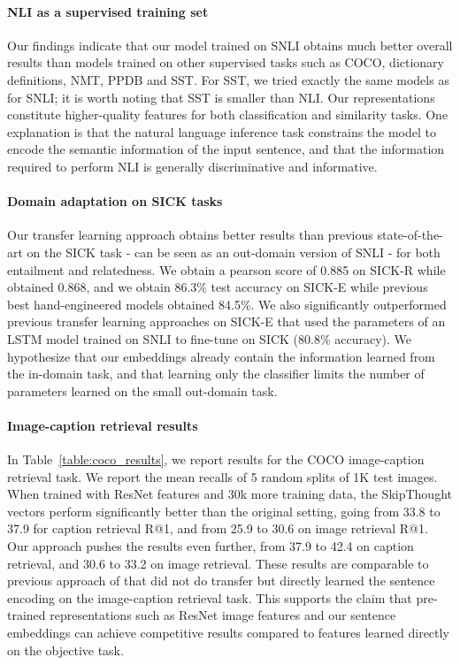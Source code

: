 \documentclass[11pt,letterpaper]{article}
\begin{document}
\paragraph{NLI as a supervised training set}
Our findings indicate that our model trained on SNLI obtains much better overall results than models trained on other supervised tasks such as COCO, dictionary definitions, NMT, PPDB \cite{ganitkevitch2013ppdb} and SST. 
For SST, we tried exactly the same models as for SNLI; it is worth noting that SST is smaller than NLI.
Our representations constitute higher-quality features for both classification and similarity tasks. One explanation is that the natural language inference task constrains the model to encode the semantic information of the input sentence, and that the information required to perform NLI is generally discriminative and informative.

\paragraph{Domain adaptation on SICK tasks}
Our transfer learning approach obtains better results than previous state-of-the-art on the SICK task - can be seen as an out-domain version of SNLI - for both entailment and relatedness. We obtain a pearson score of 0.885 on SICK-R while \cite{tai2015improved} obtained 0.868, and we obtain 86.3\% test accuracy on SICK-E while previous best hand-engineered models \cite{lai2014illinois} obtained 84.5\%.
We also significantly outperformed previous transfer learning approaches on SICK-E \cite{bowman2015large} that used the parameters of an LSTM model trained on SNLI to fine-tune on SICK (80.8\% accuracy). We hypothesize that our embeddings already contain the information learned from the in-domain task, and that learning only the classifier limits the number of parameters learned on the small out-domain task.


\paragraph{Image-caption retrieval results}
In Table~\ref{table:coco_results}, we report results for the COCO image-caption retrieval task. We report the mean recalls of 5 random splits of 1K test images. When trained with ResNet features and 30k more training data, the SkipThought vectors perform significantly better than the original setting, going from 33.8 to 37.9 for caption retrieval R@1, and from 25.9 to 30.6 on image retrieval R@1. Our approach pushes the results even further, from 37.9 to 42.4 on caption retrieval, and 30.6 to 33.2 on image retrieval. These results are comparable to previous approach of \cite{ma2015multimodal} that did not do transfer but directly learned the sentence encoding on the image-caption retrieval task. This supports the claim that pre-trained representations such as ResNet image features and our sentence embeddings can achieve competitive results compared to features learned directly on the objective task.
\end{document}
